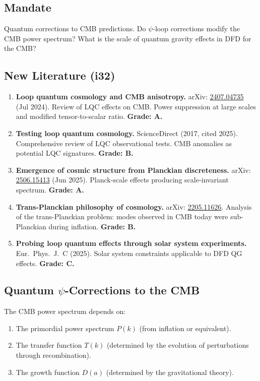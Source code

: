 \documentclass[11pt,a4paper]{article}
\begin{document}
\subsection{Mandate}

Quantum corrections to CMB predictions. Do $\psi$-loop corrections modify the CMB power spectrum? What is the scale of quantum gravity effects in DFD for the CMB?

\subsection{New Literature (i32)}

\begin{enumerate}
\item \textbf{Loop quantum cosmology and CMB anisotropy.} arXiv: \href{https://arxiv.org/abs/2407.04735}{2407.04735} (Jul 2024). Review of LQC effects on CMB. Power suppression at large scales and modified tensor-to-scalar ratio. \textbf{Grade: A.}

\item \textbf{Testing loop quantum cosmology.} ScienceDirect (2017, cited 2025). Comprehensive review of LQC observational tests. CMB anomalies as potential LQC signatures. \textbf{Grade: B.}

\item \textbf{Emergence of cosmic structure from Planckian discreteness.} arXiv: \href{https://arxiv.org/abs/2506.15413}{2506.15413} (Jun 2025). Planck-scale effects producing scale-invariant spectrum. \textbf{Grade: A.}

\item \textbf{Trans-Planckian philosophy of cosmology.} arXiv: \href{https://arxiv.org/abs/2205.11626}{2205.11626}. Analysis of the trans-Planckian problem: modes observed in CMB today were sub-Planckian during inflation. \textbf{Grade: B.}

\item \textbf{Probing loop quantum effects through solar system experiments.} Eur.\ Phys.\ J.\ C (2025). Solar system constraints applicable to DFD QG effects. \textbf{Grade: C.}
\end{enumerate}

\subsection{Quantum $\psi$-Corrections to the CMB}
\label{sec:CMB-quantum}

The CMB power spectrum depends on:
\begin{enumerate}
\item The primordial power spectrum $P(k)$ (from inflation or equivalent).
\item The transfer function $T(k)$ (determined by the evolution of perturbations through recombination).
\item The growth function $D(a)$ (determined by the gravitational theory).
\end{enumerate}
\end{document}
